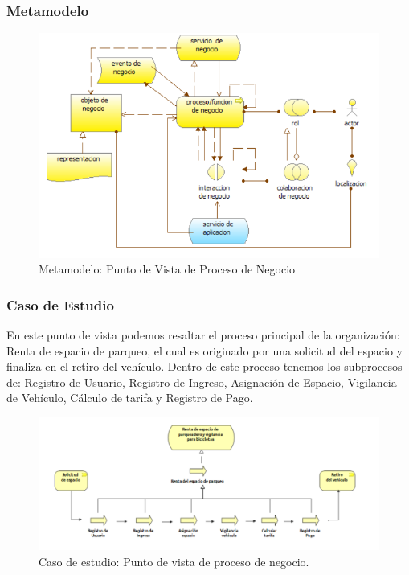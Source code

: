 \subsubsection{Metamodelo}
\begin{figure}[H]
	\centering
	\includegraphics[width=1.0\textwidth]{imagenes/Metamodelos/Negocio/meta_proceso_negocio.png}
	\caption{Metamodelo: Punto de Vista de Proceso de Negocio}
	\label{fig:gap_analysis}
\end{figure}


\subsubsection{Caso de Estudio}
En este punto de vista podemos resaltar el proceso principal de la organización: Renta de espacio de parqueo, el cual es originado por una solicitud del espacio y finaliza en el retiro del vehículo. Dentro de este proceso tenemos los subprocesos de: Registro de Usuario, Registro de Ingreso, Asignación de Espacio, Vigilancia de Vehículo, Cálculo de tarifa y Registro de Pago.

\begin{figure}[H]
	\centering
	\includegraphics[width=1.0\textwidth]{imagenes/Caso_estudio/Negocio/ProNegocio.PDF}
	\caption{Caso de estudio: Punto de vista de proceso de negocio.}
	\label{fig:gap_analysis}
\end{figure}

